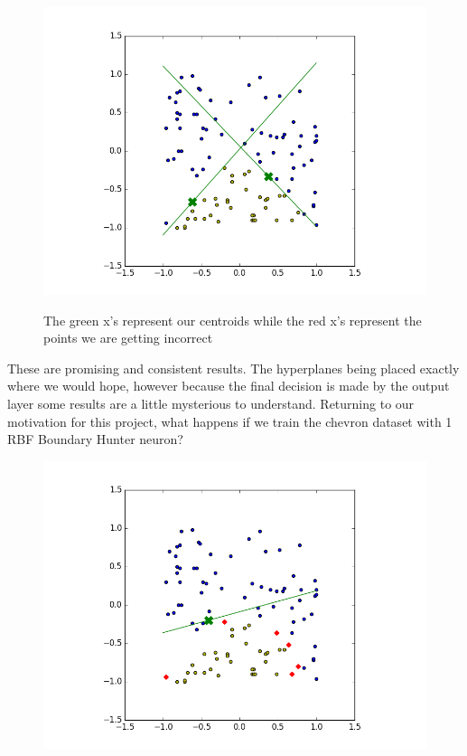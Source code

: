 \documentclass[notitlepage]{report}
\theoremstyle{definition}
\begin{document}
\begin{figure}[H]
\begin{minipage}[b]{0.4\textwidth}
    \includegraphics[width=\textwidth]{RBFN-BH-03.png}
    \caption{}
  \end{minipage}
  \hfill

The green x's represent our centroids while the red x's represent the points we are getting incorrect
\end{figure}

These are promising and consistent results. The hyperplanes being placed exactly where we would hope, however because the final decision is made by the output layer some results are a little mysterious to understand. Returning to our motivation for this project, what happens if we train the chevron dataset with 1 RBF Boundary Hunter neuron?

\begin{figure}[H]
  \centering
  \begin{minipage}[b]{0.4\textwidth}
    \includegraphics[width=\textwidth]{RBFN-BH-04.png}
    \caption{}
  \end{minipage}
  \hfill
\end{figure}
\end{document}
